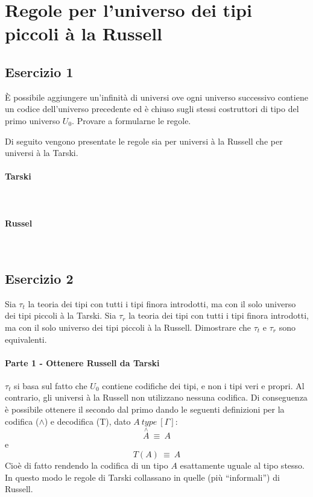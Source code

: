 \section{Regole per l’universo dei tipi piccoli à la Russell}
\subsection{Esercizio 1}
\begin{thm} 
	\`E possibile aggiungere un'infinità di universi ove ogni universo successivo contiene un codice dell'universo precedente ed è chiuso sugli stessi costruttori di tipo del primo universo $U_0$. Provare a formularne le regole.
\end{thm}
Di seguito vengono presentate le regole sia per universi à la Russell che per universi à la Tarski.

\paragraph{Tarski} \mbox{} \\


\paragraph{Russel} \mbox{} \\


\subsection{Esercizio 2}
\begin{thm}
	Sia $\tau_t$ la teoria dei tipi con tutti i tipi finora introdotti, ma con il solo universo dei tipi piccoli à la Tarski. Sia $\tau_r$ la teoria dei tipi con tutti i tipi finora introdotti, ma con il solo universo dei tipi piccoli à la Russell. Dimostrare che $\tau_t$ e $\tau_r$ sono equivalenti.
\end{thm}
\paragraph{Parte 1 - Ottenere Russell da Tarski}
$\tau_t$ si basa sul fatto che $U_0$ contiene codifiche dei tipi, e non i tipi veri e propri. Al contrario, gli universi à la Russell non utilizzano nessuna codifica. Di conseguenza è possibile ottenere il secondo dal primo dando le seguenti definizioni per la codifica ($\wedge$) e decodifica (T), dato $A~type~[\Gamma]$:
\[\stackrel{\wedge}{A}~\equiv~A\] e 
\[T(A)~\equiv~A\]
Cioè di fatto rendendo la codifica di un tipo $A$ esattamente uguale al tipo stesso. In questo modo le regole di Tarski collassano in quelle (più ``informali'') di Russell.